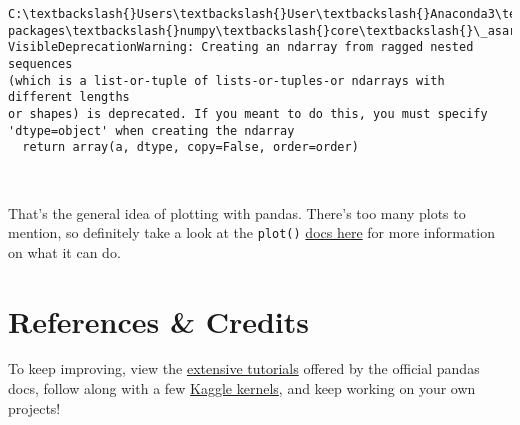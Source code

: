 \documentclass[11pt]{article}
\begin{document}
    \begin{Verbatim}[commandchars=\\\{\}]
C:\textbackslash{}Users\textbackslash{}User\textbackslash{}Anaconda3\textbackslash{}lib\textbackslash{}site-packages\textbackslash{}numpy\textbackslash{}core\textbackslash{}\_asarray.py:83:
VisibleDeprecationWarning: Creating an ndarray from ragged nested sequences
(which is a list-or-tuple of lists-or-tuples-or ndarrays with different lengths
or shapes) is deprecated. If you meant to do this, you must specify
'dtype=object' when creating the ndarray
  return array(a, dtype, copy=False, order=order)
    \end{Verbatim}

    \begin{center}
    \end{center}
    { \hspace*{\fill} \\}
    
    That's the general idea of plotting with pandas. There's too many plots
to mention, so definitely take a look at the \texttt{plot()}
\href{https://pandas.pydata.org/pandas-docs/stable/generated/pandas.DataFrame.plot.html}{docs
here} for more information on what it can do.

    \hypertarget{references-credits}{%
\section{References \& Credits}\label{references-credits}}

    To keep improving, view the
\href{https://pandas.pydata.org/pandas-docs/stable/tutorials.html}{extensive
tutorials} offered by the official pandas docs, follow along with a few
\href{https://www.kaggle.com/kernels}{Kaggle kernels}, and keep working
on your own projects!


    
    
    
\end{document}
